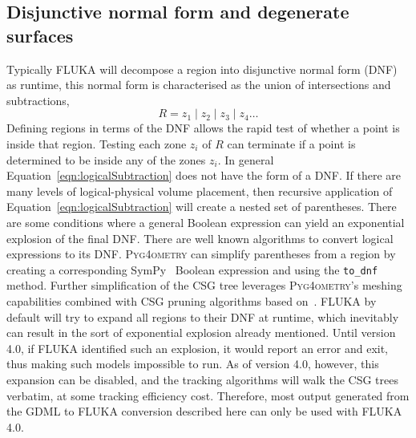 \documentclass[final,5p,times,twocolumn]{elsarticle}
\newcommand{\PYGEOMETRY}{\textsc{Pyg4ometry}}
\begin{document}
\subsection{Disjunctive normal form and degenerate surfaces}
Typically FLUKA will decompose a region into disjunctive normal form (DNF)
as runtime, this normal form is characterised as the union of intersections and subtractions,
\begin{equation}
R = z_1 \; | \;z_2\;  | \; z_3 	\; | \; z_4 \dots
\end{equation}
Defining regions in terms of the DNF allows the rapid test of whether a point is inside that region. Testing each zone
$z_i$ of $R$ can terminate if a point is determined to be inside any of the zones $z_i$. In general
Equation~\ref{eqn:logicalSubtraction} does not have the form of a DNF. If there are many levels of logical-physical volume
placement, then recursive application of  Equation~\ref{eqn:logicalSubtraction} will create a nested set of
parentheses. There are some conditions where a general Boolean expression can yield an exponential
explosion of the final DNF. There are well known algorithms to convert logical expressions to its DNF.
\PYGEOMETRY{} can simplify parentheses from a region by creating a corresponding SymPy~\cite{10.7717/peerj-cs.103} Boolean
expression and using the \verb|to_dnf| method.  Further simplification of the CSG tree leverages \PYGEOMETRY{}'s
meshing capabilities combined with CSG pruning algorithms based
on~\cite{pruning}.  FLUKA by default will try to expand all regions to
their DNF at runtime, which inevitably can result in the sort of exponential explosion already mentioned.  Until version 4.0, if FLUKA identified
such an explosion, it would report an error and exit, thus making such models impossible to run.  As of version 4.0, however, this
expansion can be disabled, and the tracking algorithms will walk the CSG trees verbatim, at some tracking efficiency cost.  Therefore, most
output generated from the GDML to FLUKA conversion described here can only be used with FLUKA 4.0.
\end{document}
